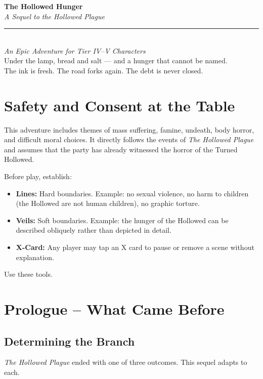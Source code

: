 \documentclass[10pt,twoside]{book}
\begin{document}
\titlepage
\begin{center}
\vspace*{2cm}
{\huge\bfseries\color{threadRed} The Hollowed Hunger}\\[0.8cm]
{\Large\itshape A Sequel to the Hollowed Plague}\\[1.5cm]
\rule{0.6\textwidth}{1pt}\\[0.5cm]
\emph{An Epic Adventure for Tier IV--V Characters}\\[1cm]
\vfill
{\small \textcolor{chainGrey}{Under the lamp, bread and salt --- and a hunger that cannot be named.}}\\[0.2cm]
{\small \textcolor{chainGrey}{The ink is fresh. The road forks again. The debt is never closed.}}
\end{center}
\newpage

\chapter*{Safety and Consent at the Table}
This adventure includes themes of mass suffering, famine, undeath, body horror, and difficult moral choices. It directly follows the events of \textit{The Hollowed Plague} and assumes that the party has already witnessed the horror of the Turned Hollowed.

Before play, establish:
\begin{itemize}
\item \textbf{Lines:} Hard boundaries. Example: no sexual violence, no harm to children (the Hollowed are not human children), no graphic torture.
\item \textbf{Veils:} Soft boundaries. Example: the hunger of the Hollowed can be described obliquely rather than depicted in detail.
\item \textbf{X-Card:} Any player may tap an X card to pause or remove a scene without explanation.
\end{itemize}
Use these tools.

\tableofcontents
\newpage


\chapter{Prologue -- What Came Before}

\section{Determining the Branch}
\textit{The Hollowed Plague} ended with one of three outcomes. This sequel adapts to each.
\end{document}
